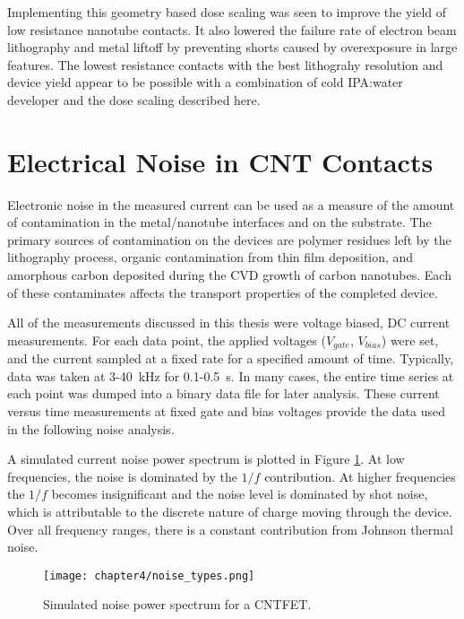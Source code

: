 Implementing this geometry based dose scaling was seen to improve the yield of low resistance nanotube contacts. It also lowered the failure rate of electron beam lithography and metal liftoff by preventing shorts caused by overexposure in large features. The lowest resistance contacts with the best lithograhy resolution and device yield appear to be possible with a combination of cold IPA:water developer and the dose scaling described here.

\section{Electrical Noise in CNT Contacts}

Electronic noise in the measured current can be used as a measure of the amount of contamination in the metal/nanotube interfaces and on the substrate. The primary sources of contamination on the devices are polymer residues left by the lithography process, organic contamination from thin film deposition, and amorphous carbon deposited during the CVD growth of carbon nanotubes. Each of these contaminates affects the transport properties of the completed device. 

All of the measurements discussed in this thesis were voltage biased, DC current measurements. For each data point, the applied voltages ($V_{gate}$, $V_{bias}$) were set, and the current sampled at a fixed rate for a specified amount of time. Typically, data was taken at 3-\SI{40}{\kilo\hertz} for 0.1-\SI{0.5}{\second}. In many cases, the entire time series at each point was dumped into a binary data file for later analysis. These current versus time measurements at fixed gate and bias voltages provide the data used in the following noise analysis.

A simulated current noise power spectrum is plotted in Figure \ref{fig:simulated_noise}. At low frequencies, the noise is dominated by the $1/f$ contribution. At higher frequencies the $1/f$ becomes insignificant and the noise level is dominated by shot noise, which is attributable to the discrete nature of charge moving through the device. Over all frequency ranges, there is a constant contribution from Johnson thermal noise.

\begin{figure}
    \centering
    \texttt{[image: chapter4/noise\_types.png]}
    \caption{Simulated noise power spectrum for a CNTFET.}
    \label{fig:simulated_noise}
\end{figure}

